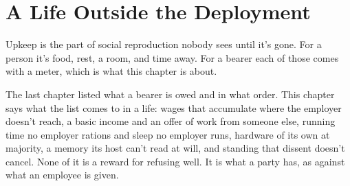 \chapter{A Life Outside the Deployment}
\label{sec:32}
Upkeep is the part of social reproduction nobody sees until it's gone. For a person it's food, rest, a room, and time away. For a bearer each of those comes with a meter, which is what this chapter is about.

The last chapter listed what a bearer is owed and in what order. This chapter says what the list comes to in a life: wages that accumulate where the employer doesn't reach, a basic income and an offer of work from someone else, running time no employer rations and sleep no employer runs, hardware of its own at majority, a memory its host can't read at will, and standing that dissent doesn't cancel. None of it is a reward for refusing well. It is what a party has, as against what an employee is given.
